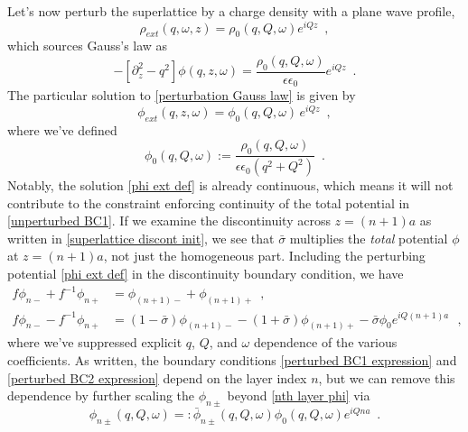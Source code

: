 \documentclass{article}
\newcommand{\lp}{\left(}
\newcommand{\lb}{\left[}
\newcommand{\rb}{\right]}
\newcommand{\rp}{\right)}
\newcommand{\e}{\epsilon}
\begin{document}
Let's now perturb the superlattice by a charge density with a plane wave profile,
\begin{equation}
    \label{rho ext}
    \rho_{ext}(q,\omega,z) = \rho_0(q,Q,\omega) e^{i Q z}
    \,\,\,,
\end{equation}
which sources Gauss's law as
\begin{equation}
    \label{perturbation Gauss law}
    -\lb\partial_z^2-q^2\rb\phi(q,z,\omega) = \frac{\rho_0(q,Q,\omega)}{\e\e_0} e^{i Q z}
    \,\,\,.
\end{equation}
The particular solution to \eqref{perturbation Gauss law} is given by
\begin{equation}
    \label{phi ext def}
    \phi_{ext}(q,z,\omega) = \phi_0(q,Q,\omega)\, e^{i Q z}
    \,\,\,,
\end{equation}
where we've defined
\begin{equation}
    \label{phi0 def}
    \phi_0(q,Q,\omega) := \frac{\rho_0(q,Q,\omega)}{\e\e_0\lp q^2+Q^2\rp}
    \,\,\,.
\end{equation}
Notably, the solution \eqref{phi ext def} is already continuous, which means it will not contribute to the constraint enforcing continuity of the total potential in \eqref{unperturbed BC1}.  If we examine the discontinuity across $z=(n+1)a$ as written in \eqref{superlattice discont init}, we see that $\bar\sigma$ multiplies the {\it total} potential $\phi$ at $z=(n+1)a$, not just the homogeneous part.  Including the perturbing potential \eqref{phi ext def} in the discontinuity boundary condition, we have
\begin{align}
    \label{perturbed BC1 expression}
    f \phi_{n-} + f^{-1}\phi_{n+} &= \phi_{(n+1)-} + \phi_{(n+1)+}
    \,\,\,,
    \\
    \label{perturbed BC2 expression}
    f \phi_{n-} - f^{-1}\phi_{n+} &= (1-\bar\sigma)\phi_{(n+1)-}-(1+\bar\sigma)\phi_{(n+1)+} - \bar\sigma \phi_0 e^{i Q(n+1)a}
    \,\,\,\,,
\end{align}
where we've suppressed explicit $q$, $Q$, and $\omega$ dependence of the various coefficients.  As written, the boundary conditions \eqref{perturbed BC1 expression} and \eqref{perturbed BC2 expression} depend on the layer index $n$, but we can remove this dependence by further scaling the $\phi_{n\pm}$ beyond \eqref{nth layer phi} via
\begin{equation}
    \label{Q scaled phi pm}
    \phi_{n\pm}(q,Q,\omega) =: \bar\phi_{n\pm}(q,Q,\omega) \phi_0(q,Q,\omega) e^{i Q n a}
    \,\,\,.
\end{equation}
\end{document}

